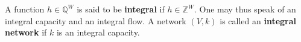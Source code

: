 A function $h \in \mathbb{Q}^W$ is said to be \textbf{integral} if $h \in \mathbb{Z}^W$. One may thus speak of an integral capacity and an integral flow. A network $(V, k)$ is called an \textbf{integral network} if $k$ is an integral capacity.
